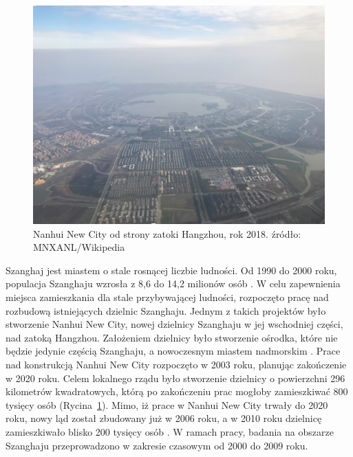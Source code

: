 \documentclass{amuthesis}
\begin{document}
\begin{figure}[t]

{\centering \includegraphics[width=1\textwidth,height=\textheight]{figures/china/china_aoi.jpg}

}

\caption{\label{fig-cn_aoi}Nanhui New City od strony zatoki Hangzhou,
rok 2018. źródło: MNXANL/Wikipedia}

\end{figure}

Szanghaj jest miastem o stale rosnącej liczbie ludności. Od 1990 do 2000
roku, populacja Szanghaju wzrosła z 8,6 do 14,2 milionów osób
\autocite{desaunited}. W celu zapewnienia miejsca zamieszkania dla stale
przybywającej ludności, rozpoczęto pracę nad rozbudową istniejących
dzielnic Szanghaju. Jednym z takich projektów było stworzenie Nanhui New
City, nowej dzielnicy Szanghaju w jej wschodniej części, nad zatoką
Hangzhou. Założeniem dzielnicy było stworzenie ośrodka, które nie będzie
jedynie częścią Szanghaju, a nowoczesnym miastem nadmorskim
\autocite{shi2016new}. Prace nad konstrukcją Nanhui New City rozpoczęto
w 2003 roku, planując zakończenie w 2020 roku. Celem lokalnego rządu
było stworzenie dzielnicy o powierzchni 296 kilometrów kwadratowych,
którą po zakończeniu prac mogłoby zamieszkiwać 800 tysięcy osób
(Rycina~\ref{fig-cn_aoi}). Mimo, iż prace w Nanhui New City trwały do
2020 roku, nowy ląd został zbudowany już w 2006 roku, a w 2010 roku
dzielnicę zamieszkiwało blisko 200 tysięcy osób \autocite{shi2016new}. W
ramach pracy, badania na obszarze Szanghaju przeprowadzono w zakresie
czasowym od 2000 do 2009 roku.
\end{document}
